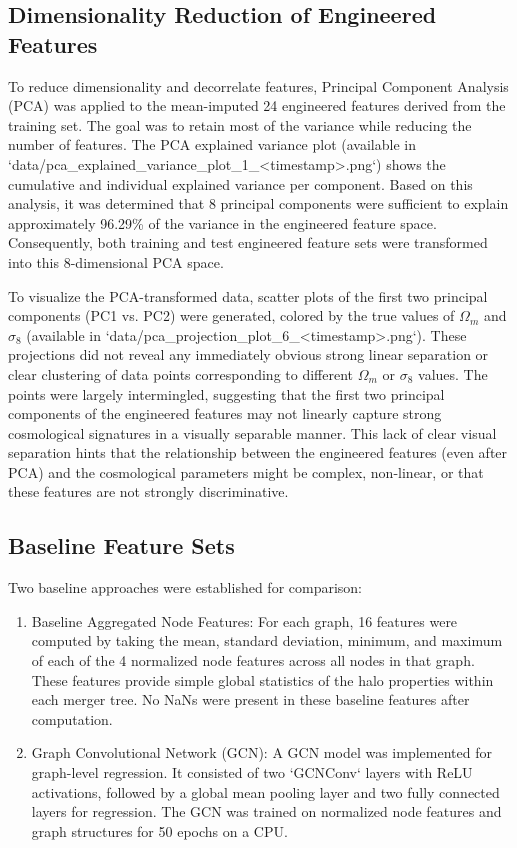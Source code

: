 \documentclass[twocolumn]{aastex631}
\begin{document}
\subsection{Dimensionality Reduction of Engineered Features}

To reduce dimensionality and decorrelate features, Principal Component Analysis (PCA) was applied to the mean-imputed 24 engineered features derived from the training set. The goal was to retain most of the variance while reducing the number of features. The PCA explained variance plot (available in `data/pca_explained_variance_plot_1_<timestamp>.png`) shows the cumulative and individual explained variance per component. Based on this analysis, it was determined that 8 principal components were sufficient to explain approximately 96.29\% of the variance in the engineered feature space. Consequently, both training and test engineered feature sets were transformed into this 8-dimensional PCA space.

To visualize the PCA-transformed data, scatter plots of the first two principal components (PC1 vs. PC2) were generated, colored by the true values of $\Omega_m$ and $\sigma_8$ (available in `data/pca_projection_plot_6_<timestamp>.png`). These projections did not reveal any immediately obvious strong linear separation or clear clustering of data points corresponding to different $\Omega_m$ or $\sigma_8$ values. The points were largely intermingled, suggesting that the first two principal components of the engineered features may not linearly capture strong cosmological signatures in a visually separable manner. This lack of clear visual separation hints that the relationship between the engineered features (even after PCA) and the cosmological parameters might be complex, non-linear, or that these features are not strongly discriminative.

\subsection{Baseline Feature Sets}

Two baseline approaches were established for comparison:
\begin{enumerate}
    \item Baseline Aggregated Node Features: For each graph, 16 features were computed by taking the mean, standard deviation, minimum, and maximum of each of the 4 normalized node features across all nodes in that graph. These features provide simple global statistics of the halo properties within each merger tree. No NaNs were present in these baseline features after computation.
    \item Graph Convolutional Network (GCN): A GCN model was implemented for graph-level regression. It consisted of two `GCNConv` layers with ReLU activations, followed by a global mean pooling layer and two fully connected layers for regression. The GCN was trained on normalized node features and graph structures for 50 epochs on a CPU.
\end{enumerate}
\end{document}

